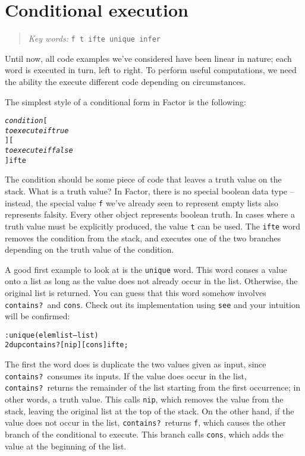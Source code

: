 \documentclass[english]{book}
\newcommand{\chapkeywords}[1]{{\parbox{10cm}{\begin{minipage}[b]{10cm}
\begin{quote}
\emph{Key words:} \texttt{#1}
\end{quote}
\end{minipage}}}}
\begin{document}
\section{Conditional execution}

\chapkeywords{f t ifte unique infer}

Until now, all code examples we've considered have been linear in nature; each word is executed in turn, left to right. To perform useful computations, we need the ability the execute different code depending on circumstances.

The simplest style of a conditional form in Factor is the following:

\begin{alltt}
\emph{condition} {[}
    \emph{to execute if true}
{] [}
    \emph{to execute if false}
{]} ifte
\end{alltt}

The condition should be some piece of code that leaves a truth value on the stack. What is a truth value? In Factor, there is no special boolean data type
-- instead, the special value \texttt{f} we've already seen to represent empty lists also represents falsity. Every other object represents boolean truth. In cases where a truth value must be explicitly produced, the value \texttt{t} can be used. The \texttt{ifte} word removes the condition from the stack, and executes one of the two branches depending on the truth value of the condition.

A good first example to look at is the \texttt{unique} word. This word conses a value onto a list as long as the value does not already occur in the list. Otherwise, the original list is returned. You can guess that this word somehow involves \texttt{contains?}~and \texttt{cons}. Check out its implementation using \texttt{see} and your intuition will be confirmed:

\begin{alltt}
: unique ( elem list -- list )
    2dup contains? [ nip ] [ cons ] ifte ;
\end{alltt}

The first the word does is duplicate the two values given as input, since \texttt{contains?}~consumes its inputs. If the value does occur in the list, \texttt{contains?}~returns the remainder of the list starting from the first occurrence; in other words, a truth value. This calls \texttt{nip}, which removes the value from the stack, leaving the original list at the top of the stack. On the other hand, if the value does not occur in the list, \texttt{contains?}~returns \texttt{f}, which causes the other branch of the conditional to execute. This branch calls \texttt{cons}, which adds the value at the beginning of the list. 
\end{document}
